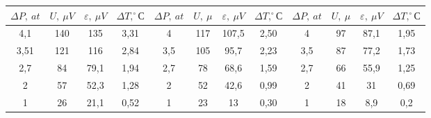 \begin{tabular}{cccc|cccc|cccc}
	\toprule
	$ \Delta P,~at $   & $ U,~\mu V $ & $ \varepsilon,~\mu V $    & $ \Delta T, ^\circ{С} $   
	& $ \Delta P,~at $   & $ U,~\mu  $ & $ \varepsilon,~\mu V $    & $ \Delta T, ^\circ{С} $ 
	& $ \Delta P,~at $   & $ U,~\mu  $ & $ \varepsilon,~\mu V $    & $ \Delta T, ^\circ{С} $           \\\midrule
	4,1     & 140      & 135  & 3,31   & 4       & 117  & 107,5 & 2,50 & 4       & 97 & 87,1 & 1,95 \\
	3,51    & 121     & 116  & 2,84   & 3,5     & 105 & 95,7  & 2,23 & 3,5     & 87 & 77,2 & 1,73 \\
	2,7     & 84    & 79,1 & 1,94   & 2,7     & 78 & 68,6  & 1,59 & 2,7     & 66 & 55,9 & 1,25 \\
	2       & 57    & 52,3 & 1,28   & 2       & 52 & 42,6  & 0,99 & 2       & 41 & 31  & 0,69 \\
	1       & 26    & 21,1 & 0,52   & 1       & 23 & 13    & 0,30 & 1       & 18 & 8,9  & 0,2  \\
	\bottomrule      
\end{tabular}
